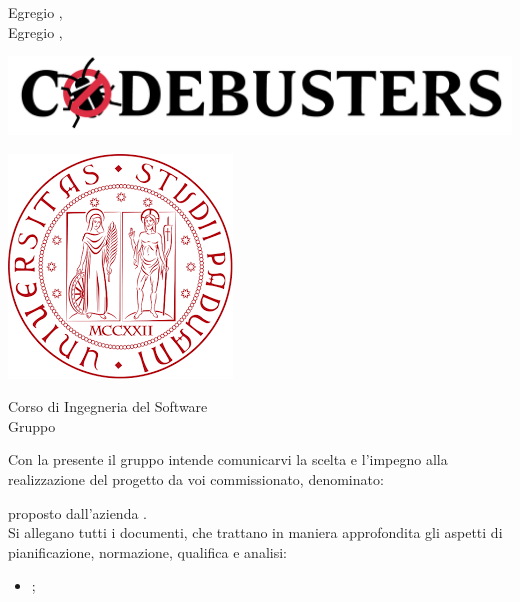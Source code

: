 \documentclass[11pt]{letter}
\begin{document}
    \begin{letter}
        { Egregio \VT{},\\Egregio \CR{},}
        \begin{minipage}{.4\textwidth}
            \begin{flushleft}
                \includegraphics[width=1.5\textwidth]{Utility/Images/logo2.png}
            \end{flushleft}
        \end{minipage}
        \begin{minipage}{.5\textwidth}
            \begin{flushright}
                \includegraphics[width=.4\linewidth]{Utility/Images/logoUnipd.png}
            \end{flushright}
        \end{minipage}
        {    
        \begin{flushleft}
            Corso di Ingegneria del Software\\ Gruppo \Gruppo{}\\ 
        \end{flushleft}
        }
        \opening{ Con la presente il gruppo \Gruppo{} intende comunicarvi la scelta e l'impegno alla realizzazione del progetto da voi commissionato, denominato:}
        \begin{center}
           \textbf{\NomeProgetto{}} 
        \end{center}
        proposto dall'azienda \textbf{\Proponente{}}.\\
        Si allegano tutti i documenti, che trattano in maniera approfondita gli aspetti di pianificazione, normazione, qualifica e analisi:
        \begin{itemize}
        	\item {};

\end{itemize}
\end{letter}
\end{document}
